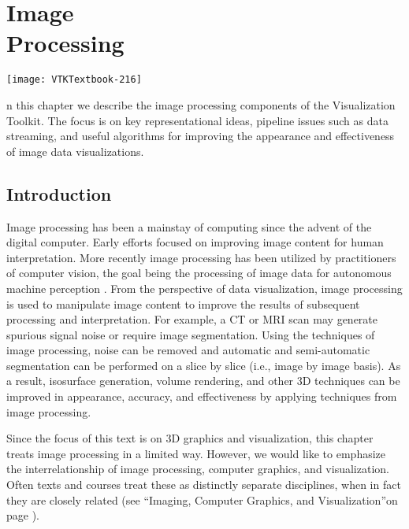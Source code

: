 \chapter[Image Processing]{Image\\ Processing}
\label{chap:image_processing}

\vspace{-9\baselineskip} %
\hfill
 \begin{minipage}{0.5\textwidth}
 \centering
 \texttt{[image: VTKTextbook-216]}
 \end{minipage}
\vspace{2\baselineskip}

n this chapter we describe the image processing components of the Visualization Toolkit.
The focus is on key representational ideas, pipeline issues such as data streaming, and useful algorithms for improving the appearance and effectiveness of image data visualizations.

\section{Introduction}

Image processing has been a mainstay of computing since the advent of the digital computer. Early efforts focused on improving image content for human interpretation. More recently image processing has been utilized by practitioners of computer vision, the goal being the processing of image data for autonomous machine perception \cite{Gonzalez92}. From the perspective of data visualization, image processing is used to manipulate image content to improve the results of subsequent processing and interpretation. For example, a CT or MRI scan may generate spurious signal noise or require image segmentation. Using the techniques of image processing, noise can be removed and automatic and semi-automatic segmentation can be performed on a slice by slice (i.e., image by image basis). As a result, isosurface generation, volume rendering, and other 3D techniques can be improved in appearance, accuracy, and effectiveness by applying techniques from image processing.

Since the focus of this text is on 3D graphics and visualization, this chapter treats image processing in a limited way. However, we would like to emphasize the interrelationship of image processing, computer graphics, and visualization. Often texts and courses treat these as distinctly separate disciplines, when in fact they are closely related (see ``Imaging, Computer Graphics, and Visualization''on page \pageref{sec:imaging_computer_graphics_visualization}).

